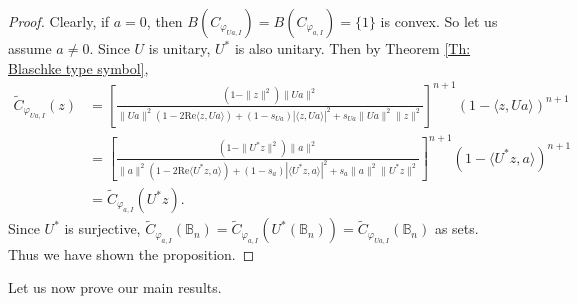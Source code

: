\documentclass{amsart}
\theoremstyle{remark}
\begin{document}
\begin{proof}
Clearly, if $a=0$, then $B(C_{\varphi_{Ua,I}})=B(C_{\varphi_{a,I}})=\{1\}$ is convex.  So
let us assume $a\neq 0$.  Since $U$ is unitary, $U^*$ is also unitary.  Then by Theorem \ref{Th: Blaschke type symbol},
\begin{align*}
\widetilde{C}_{\varphi_{Ua,I}}(z)&=\left[\frac{(1 - \|z\|^{2})\|Ua\|^{2}}{\|Ua\|^{2}(1-2\mathrm{Re}\langle z,Ua \rangle) + (1-s_{Ua})|\langle z,Ua \rangle|^2 + s_{Ua}\|Ua\|^2\|z\|^2}\right]^{n+1}(1 - \langle z,Ua \rangle)^{n+1}\\
&=\left[\frac{(1 - \|U^*z\|^{2})\|a\|^{2}}{\|a\|^{2}(1-2\mathrm{Re}\langle U^*z,a \rangle) + (1-s_{a})|\langle U^*z,a \rangle|^2 + s_{a}\|a\|^2\|U^*z\|^2}\right]^{n+1}(1 - \langle U^*z,a \rangle)^{n+1}\\
&=\widetilde{C}_{\varphi_{a,I}}(U^*z).
\end{align*}
Since $U^*$ is surjective, $\widetilde{C}_{\varphi_{a,I}}(\mathbb{B}_n)=\widetilde{C}_{\varphi_{a,I}}(U^*(\mathbb{B}_n))=\widetilde{C}_{\varphi_{Ua,I}}(\mathbb{B}_n)$ as sets.  Thus we have shown the proposition.
\end{proof}
Let us now prove our main results.
\end{document}
